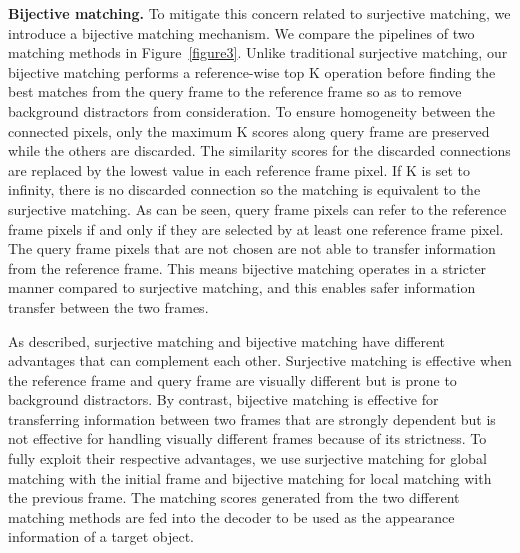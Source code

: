 \documentclass[10pt,twocolumn,letterpaper]{article}
\begin{document}
	\vspace{1mm}
	\noindent\textbf{Bijective matching.} To mitigate this concern related to surjective matching, we introduce a bijective matching mechanism. We compare the pipelines of two matching methods in Figure~\ref{figure3}. Unlike traditional surjective matching, our bijective matching performs a reference-wise top K operation before finding the best matches from the query frame to the reference frame so as to remove background distractors from consideration. To ensure homogeneity between the connected pixels, only the maximum K scores along query frame are preserved while the others are discarded. The similarity scores for the discarded connections are replaced by the lowest value in each reference frame pixel. If K is set to infinity, there is no discarded connection so the matching is equivalent to the surjective matching. As can be seen, query frame pixels can refer to the reference frame pixels if and only if they are selected by at least one reference frame pixel. The query frame pixels that are not chosen are not able to transfer information from the reference frame. This means bijective matching operates in a stricter manner compared to surjective matching, and this enables safer information transfer between the two frames.
	
	
	As described, surjective matching and bijective matching have different advantages that can complement each other. Surjective matching is effective when the reference frame and query frame are visually different but is prone to background distractors. By contrast, bijective matching is effective for transferring information between two frames that are strongly dependent but is not effective for handling visually different frames because of its strictness. To fully exploit their respective advantages, we use surjective matching for global matching with the initial frame and bijective matching for local matching with the previous frame. The matching scores generated from the two different matching methods are fed into the decoder to be used as the appearance information of a target object.
	
	
\end{document}
